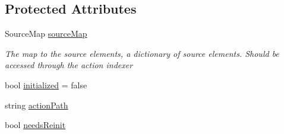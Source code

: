 \subsection*{Protected Attributes}
\begin{DoxyCompactItemize}
\item 
Source\+Map \mbox{\hyperlink{class_valve_1_1_v_r_1_1_steam_v_r___action_a70a7f08d07c54c294f26441619352401}{source\+Map}}
\begin{DoxyCompactList}\small\item\em The map to the source elements, a dictionary of source elements. Should be accessed through the action indexer \end{DoxyCompactList}\item 
bool \mbox{\hyperlink{class_valve_1_1_v_r_1_1_steam_v_r___action_ab8b674e7217eb047723b26597088c703}{initialized}} = false
\item 
string \mbox{\hyperlink{class_valve_1_1_v_r_1_1_steam_v_r___action_a75a8c6b9641982a47e32039b131e3eca}{action\+Path}}
\item 
bool \mbox{\hyperlink{class_valve_1_1_v_r_1_1_steam_v_r___action_a361379ce58b79d870a16b3a07cabcdbf}{needs\+Reinit}}
\end{DoxyCompactItemize}
